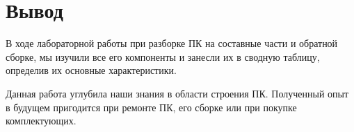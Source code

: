 \documentclass[a4paper]{article}
\begin{document}
\section{Вывод}
В ходе лабораторной работы при разборке ПК на составные части и обратной сборке, мы изучили все его компоненты и занесли их в сводную таблицу, определив их основные характеристики.

Данная работа углубила наши знания в области строения ПК. Полученный опыт в будущем пригодится при ремонте ПК, его сборке или при покупке комплектующих.
\end{document}
